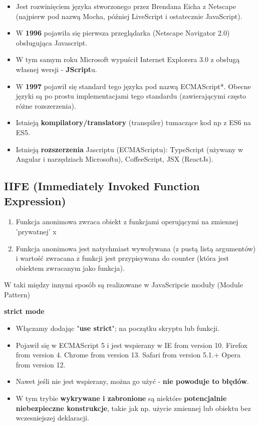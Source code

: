 \documentclass[../main.tex]{subfiles}
\begin{document}
    \begin{itemize}
        \item Jest rozwinięciem języka stworzonego przez Brendana Eicha z Netscape (najpierw pod nazwą Mocha, później LiveScript i ostatecznie JavaScript).
        \item W \textbf{1996} pojawiła się pierwsza przeglądarka (Netscape Navigator 2.0) obsługująca Javascript.
        \item W tym samym roku Microsoft wypuścił Internet Explorera 3.0 z obsługą własnej wersji - \textbf{JScript}u.
        \item W \textbf{1997} pojawił się standard tego języka pod nazwą ECMAScript*. Obecne języki są po prostu implementacjami tego standardu (zawierającymi często różne rozszerzenia).
        \item Istnieją \textbf{kompilatory/translatory} (transpiler) tumaczące kod np z ES6 na ES5.
        \item Istnieją \textbf{rozszerzenia} Jascriptu (ECMAScriptu): TypeScript (używany w Angular i narzędziach Microsoftu), CoffeeScript, JSX (ReactJs).
    \end{itemize}

    \subsection{IIFE (Immediately Invoked Function Expression)}
    \begin{enumerate}
        \item Funkcja anonimowa zwraca obiekt z funkcjami operującymi na zmiennej 'prywatnej' x
        \item Funkcja anonimowa jest natychmiast wywoływana (z pustą listą argumentów) i wartość zwracana z funkcji jest przypisywana do counter (która jest obiektem zwracanym jako funkcja).
    \end{enumerate}
    W taki między innymi sposób są realizowane w JavaScripcie moduły (Module Pattern)

    \textbf{strict mode}
    \begin{itemize}
        \item Włączamy dodając "\textbf{use strict}"; na początku skryptu lub funkcji.
        \item Pojawił się w ECMAScript 5 i jest wspierany w IE from version 10. Firefox from version 4.
        Chrome from version 13. Safari from version 5.1.+ Opera from version 12.
        \item Nawet jeśli nie jest wspierany, można go użyć - \textbf{nie powoduje to błędów}.
        \item W tym trybie \textbf{wykrywane i zabronione} są niektóre \textbf{potencjalnie niebezpieczne konstrukcje}, takie jak np. użycie zmiennej lub obiektu bez wczesniejszej deklaracji.
    \end{itemize}
\end{document}
